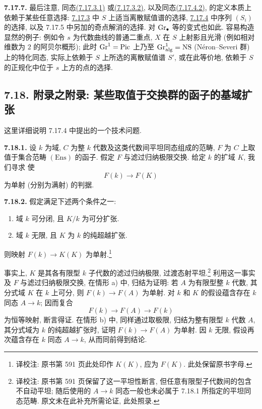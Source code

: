 \textbf{7.17.7.} 最后注意, 同态\hyperlink{sga6.e10.eq.7-17-3-1}{(7.17.3.1)} 或\hyperlink{sga6.e10.eq.7-17-3-2}{(7.17.3.2)}, 以及同态\hyperlink{sga6.e10.eq.7-17-4-2}{(7.17.4.2)}, 的定义本质上依赖于某些任意选择: \hyperlink{sga6.e10.para.7-17-3}{7.17.3} 中 $S$ 上适当离散赋值谱的选择, \hyperlink{sga6.e10.para.7-17-4}{7.17.4} 中序列 $(S_i)$ 的选择, 以及 7.17.5 中另加的奇点解消的选择. 对 $\operatorname{Gr}_\bullet$ 等的变式也如此. 容易构造显然的例子: 例如令 $s$ 为代数曲线的普通二重点, $X$ 在 $S$ 上射影且光滑 (例如相对维数为 $2$ 的阿贝尔概形); 此时 $\operatorname{Gr}^1=\operatorname{Pic}$ 上乃至 $\operatorname{Gr}^1_{\mathrm{alg}}=\mathrm{NS}$ (Néron--Severi 群) 上的特化同态, 实际上依赖于 $S$ 上所选的离散赋值谱 $S'$, 或在此等价地, 依赖于 $S$ 的正规化中位于 $s$ 上方的点的选择.
%
%
%
%
%
%
%
%
%
%
%
%

\subsection*{7.18. 附录之附录: 某些取值于交换群的函子的基域扩张} 这里详细说明 7.17.4 中提出的一个技术问题.
%
%

\textbf{7.18.1.} 设 $k$ 为域, $C$ 为整 $k$ 代数及这类代数间平坦同态组成的范畴, $F$ 为 $C$ 上取值于集合范畴 $(\mathrm{Ens})$ 的函子. 假定 $F$ 与滤过归纳极限交换. 给定 $k$ 的扩域 $K$, 我们寻求
%
%
%
%
%
使
\[
F(k)\longrightarrow F(K)
\]
为单射 (分别为满射) 的判据.

\textbf{7.18.2.} 假定满足下述两个条件之一:
%
\begin{enumerate}[label=\alph*)]
\item 域 $k$ 可分闭, 且 $K/k$ 为可分扩张. \item 域 $k$ 无限, 且 $K$ 为 $k$ 的纯超越扩张.
%
\end{enumerate}
则映射 $F(k)\to K(K)$ 为单射.\footnote{译校注: 原书第 591 页此处印作 $K(K)$, 应为 $F(K)$. 此处保留原书字母.}

事实上, $K$ 是其各有限型 $k$ 子代数的滤过归纳极限, 过渡态射平坦.\footnote{译校注: 原书第 591 页保留了这一平坦性断言, 但任意有限型子代数间的包含不自动平坦; 随后使用的 $A\to k$ 同态一般也未必属于 7.18.1 所指定的平坦同态范畴. 原文未在此补充所需论证, 此处照录.} 利用这一事实及 $F$ 与滤过归纳极限交换, 在情形 a) 中, 归结为证明: 若 $A$ 为有限型整 $k$ 代数, 其分式域 $K$ 在 $k$ 上可分, 则 $F(k)\to F(A)$ 为单射. 对 $k$ 和 $K$ 的假设蕴含存在 $k$ 同态 $A\to k$; 因而复合
%
%
%
%
%
%
\[
F(k)\longrightarrow F(A)\longrightarrow F(k)
\]
为恒等映射, 断言得证. 在情形 b) 中, 同样通过取极限, 归结为整有限型 $k$ 代数 $A$, 其分式域为 $k$ 的纯超越扩张时, 证明 $F(k)\to F(A)$ 为单射. 因 $k$ 无限, 假设再次蕴含存在 $k$ 同态 $A\to k$, 从而同前得到结论.
%
%
%
%

